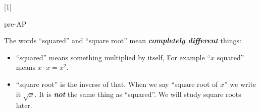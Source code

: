 



\renewcommand{\thechapter}{3} 
\renewcommand{\myCurrentChapterTitle}{Quadratic Functions}

[1]

\begin{myObjectives}
    \begin{taggedblock}{pre-AP}
    \end{taggedblock}
\end{myObjectives}

\begin{myVocabulary}
\end{myVocabulary}

\begin{center}
    \begin{tcolorbox}[width=5in]
        The words ``squared'' and ``square root'' mean 
        {\bfseries\itshape completely different} things:
        \begin{itemize}
            \item ``squared'' means something multiplied by itself,
            For example ``$x$ squared'' means $x\cdot x = x^2$.
            \item ``square root'' is the inverse of that. 
            When we say ``square root of $x$'' we write it $\sqrt{x}$.
            It is {\bfseries\itshape not} the same thing as ``squared''.
            We will study square roots later.
        \end{itemize}
    \end{tcolorbox}
\end{center}





